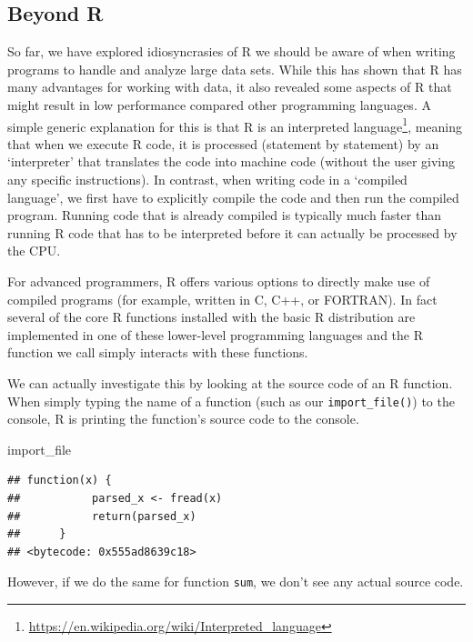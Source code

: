 \documentclass[
  12pt,
]{style/krantz}
\newenvironment{Shaded}{\begin{snugshade}}{\end{snugshade}}
\newcommand{\NormalTok}[1]{#1}
\renewcommand{\href}[2]{#2\footnote{\url{#1}}}
\begin{document}
\hypertarget{beyond-r}{%
\subsection{Beyond R}\label{beyond-r}}

So far, we have explored idiosyncrasies of R we should be aware of when writing programs to handle and analyze large data sets. While this has shown that R has many advantages for working with data, it also revealed some aspects of R that might result in low performance compared other programming languages. A simple generic explanation for this is that R is an \href{https://en.wikipedia.org/wiki/Interpreted_language}{interpreted language}, meaning that when we execute R code, it is processed (statement by statement) by an `interpreter' that translates the code into machine code (without the user giving any specific instructions). In contrast, when writing code in a `compiled language', we first have to explicitly compile the code and then run the compiled program. Running code that is already compiled is typically much faster than running R code that has to be interpreted before it can actually be processed by the CPU.

For advanced programmers, R offers various options to directly make use of compiled programs (for example, written in C, C++, or FORTRAN). In fact several of the core R functions installed with the basic R distribution are implemented in one of these lower-level programming languages and the R function we call simply interacts with these functions.

We can actually investigate this by looking at the source code of an R function. When simply typing the name of a function (such as our \texttt{import\_file()}) to the console, R is printing the function's source code to the console.

\begin{Shaded}
\begin{Highlighting}[]
\NormalTok{import\_file}
\end{Highlighting}
\end{Shaded}

\begin{verbatim}
## function(x) {
##           parsed_x <- fread(x)
##           return(parsed_x)
##      }
## <bytecode: 0x555ad8639c18>
\end{verbatim}

However, if we do the same for function \texttt{sum}, we don't see any actual source code.
\end{document}
